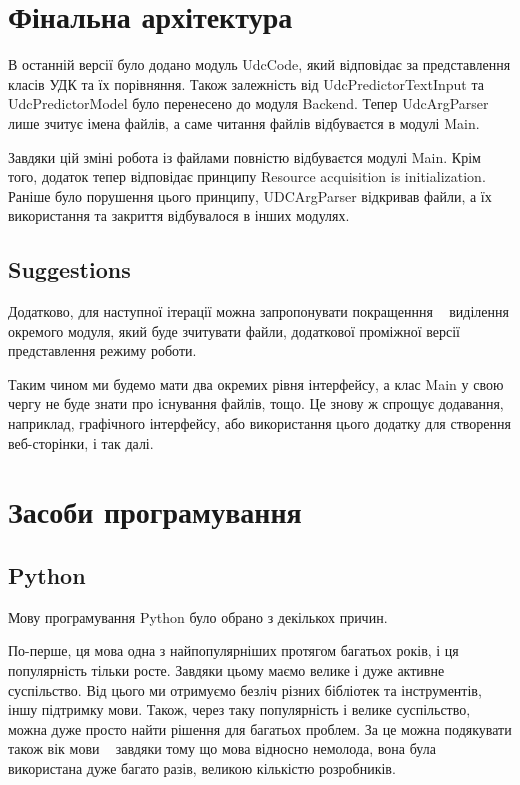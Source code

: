 \documentclass{article}
\let\oldsection\section
\renewcommand{\section}{\clearpage\oldsection}
\begin{document}
\section{Фінальна архітектура}
В останній версії було додано модуль UdcCode, який відповідає за представлення
класів УДК та їх порівняння. Також залежність від UdcPredictorTextInput
та UdcPredictorModel було перенесено до модуля Backend.
Тепер UdcArgParser лише зчитує імена файлів, а саме читання файлів відбуваєтся
в модулі Main.

Завдяки цій зміні робота із файлами повністю відбуваєтся модулі Main.
Крім того, додаток тепер відповідає принципу Resource acquisition is initialization.
Раніше було порушення цього принципу, UDCArgParser відкривав файли, 
а їх використання та закриття відбувалося в інших модулях.

\subsection{Suggestions}
Додатково, для наступної ітерації можна запропонувати покращенння \textemdash~
виділення окремого модуля, який буде зчитувати файли, додаткової проміжної
версії представлення режиму роботи.

Таким чином ми будемо мати два окремих рівня інтерфейсу,
а клас Main у свою чергу не буде знати про існування файлів, тощо.
Це знову ж спрощує додавання, наприклад, графічного інтерфейсу,
або використання цього додатку для створення веб-сторінки, і так далі.

\section{Засоби програмування}

\subsection{Python}
Мову програмування Python було обрано з декількох причин.

По-перше, ця мова одна з найпопулярніших протягом багатьох років,
і ця популярність тільки росте.
Завдяки цьому маємо велике і дуже активне суспільство.
Від цього ми отримуємо безліч різних бібліотек та інструментів, іншу підтримку мови.
Також, через таку популярність і велике суспільство,
можна дуже просто найти рішення для багатьох проблем.
За це можна подякувати також вік мови \textemdash~
завдяки тому що мова відносно немолода, вона була використана дуже багато разів,
великою кількістю розробників.
\end{document}
